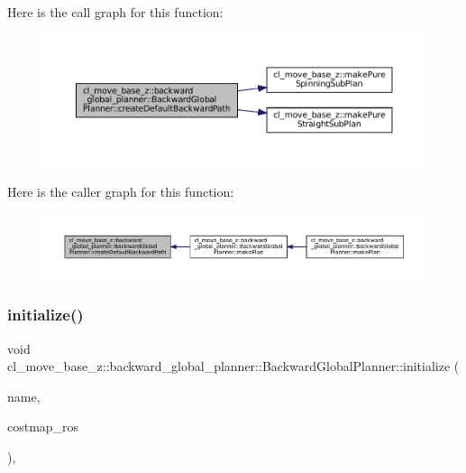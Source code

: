 Here is the call graph for this function\+:
\nopagebreak
\begin{figure}[H]
\begin{center}
\leavevmode
\includegraphics[width=350pt]{classcl__move__base__z_1_1backward__global__planner_1_1BackwardGlobalPlanner_a1b4d2eb717f9f63f2309def37c6ce297_cgraph}
\end{center}
\end{figure}
Here is the caller graph for this function\+:
\nopagebreak
\begin{figure}[H]
\begin{center}
\leavevmode
\includegraphics[width=350pt]{classcl__move__base__z_1_1backward__global__planner_1_1BackwardGlobalPlanner_a1b4d2eb717f9f63f2309def37c6ce297_icgraph}
\end{center}
\end{figure}
\mbox{\label{classcl__move__base__z_1_1backward__global__planner_1_1BackwardGlobalPlanner_af17978c77ec96d4ecc26b3a6ba75e1e9}} 
\subsubsection{\texorpdfstring{initialize()}{initialize()}}
{\footnotesize\ttfamily void cl\+\_\+move\+\_\+base\+\_\+z\+::backward\+\_\+global\+\_\+planner\+::\+Backward\+Global\+Planner\+::initialize (\begin{DoxyParamCaption}\item[{std\+::string}]{name,  }\item[{costmap\+\_\+2d\+::\+Costmap2\+D\+R\+OS $\ast$}]{costmap\+\_\+ros }\end{DoxyParamCaption})\hspace{0.3cm}{\ttfamily [override]}, {\ttfamily [virtual]}}

